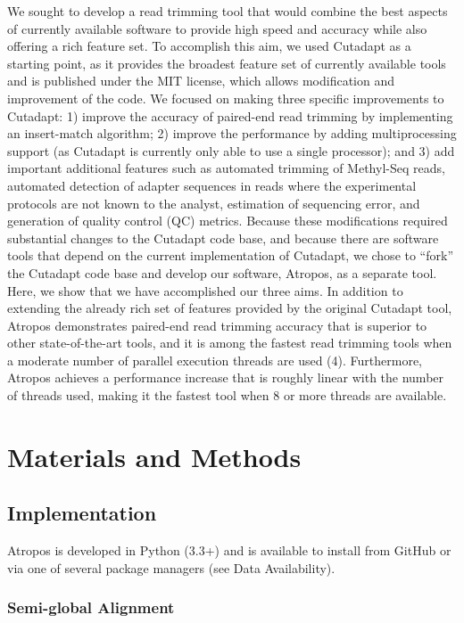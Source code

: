 \documentclass[fleqn,10pt,lineno]{wlpeerj} %
\begin{document}
We sought to develop a read trimming tool that would combine the best aspects of currently available software to provide high speed and accuracy while also offering a rich feature set. To accomplish this aim, we used Cutadapt as a starting point, as it provides the broadest feature set of currently available tools and is published under the MIT license, which allows modification and improvement of the code. We focused on making three specific improvements to Cutadapt: 1) improve the accuracy of paired-end read trimming by implementing an insert-match algorithm; 2) improve the performance by adding multiprocessing support (as Cutadapt is currently only able to use a single processor); and 3) add important additional features such as automated trimming of Methyl-Seq reads, automated detection of adapter sequences in reads where the experimental protocols are not known to the analyst, estimation of sequencing error, and generation of quality control (QC) metrics. Because these modifications required substantial changes to the Cutadapt code base, and because there are software tools that depend on the current implementation of Cutadapt, we chose to ``fork'' the Cutadapt code base and develop our software, Atropos, as a separate tool. Here, we show that we have accomplished our three aims. In addition to extending the already rich set of features provided by the original Cutadapt tool, Atropos demonstrates paired-end read trimming accuracy that is superior to other state-of-the-art tools, and it is among the fastest read trimming tools when a moderate number of parallel execution threads are used (4). Furthermore, Atropos achieves a performance increase that is roughly linear with the number of threads used, making it the fastest tool when 8 or more threads are available.

\section{Materials and Methods}

\subsection{Implementation}\label{sec:implementation}

Atropos is developed in Python (3.3+) and is available to install from GitHub or via one of several package managers (see Data Availability). 

\subsubsection{Semi-global Alignment}
\end{document}
